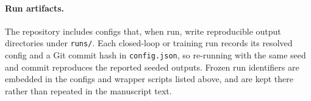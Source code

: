 \documentclass[sn-mathphys,NameDate,iicol]{sn-jnl}
\begin{document}
\begin{appendices}
\paragraph{Run artifacts.}
The repository includes configs that, when run, write reproducible
output directories under \texttt{runs/}. Each closed-loop or
training run records its resolved config and a Git commit hash in
\texttt{config.json}, so re-running with the same seed and commit
reproduces the reported seeded outputs. Frozen run identifiers are
embedded in the configs and wrapper scripts listed above, and are kept
there rather than repeated in the manuscript text.

\end{appendices}


\end{document}
